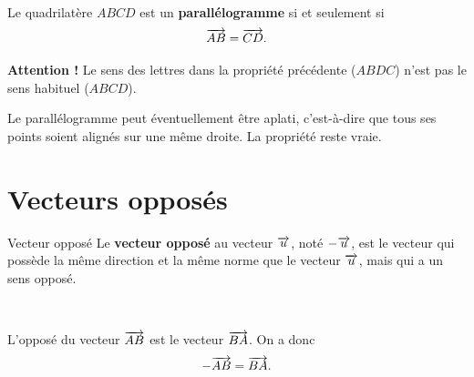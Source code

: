 \documentclass[11pt]{article}
\begin{document}
\begin{prop}~\\[-5mm]
  \begin{minipage}[]{.68\textwidth}
  Le quadrilatère $ABCD$ est un \textbf{parallélogramme} si et seulement si
  \[
    \overrightarrow{AB} = \overrightarrow{CD}.
  \]
\end{minipage}\hspace{-6mm}
  \begin{minipage}[]{.32\textwidth}
    \begin{center}
    \end{center}
  \end{minipage}
\end{prop}

\begin{rmq}
  \textbf{Attention !} Le sens des lettres dans la propriété précédente ($ABDC$)
  n'est pas le sens habituel ($ABCD$).
\end{rmq}
\begin{rmq}
  Le parallélogramme peut éventuellement être aplati, c'est-à-dire que tous ses
  points soient alignés sur une même droite. La propriété reste vraie.
\end{rmq}
\section{Vecteurs opposés}
\begin{defi}{Vecteur opposé}
  Le \textbf{vecteur opposé} au vecteur $\overrightarrow{u}$, noté $-\overrightarrow{u}$, est le
  vecteur qui possède la même direction et la même norme que le vecteur $\overrightarrow{u}$, mais qui a un sens opposé.
\end{defi}
\begin{prop}~\\[-2mm]
  \begin{minipage}[]{.6\textwidth}
  L'opposé du vecteur $\overrightarrow{AB}$ est le vecteur $\overrightarrow{BA}$. On a donc
  \[
    -\overrightarrow{AB} = \overrightarrow{BA}.
  \]
  \end{minipage}
  \begin{minipage}[]{.4\textwidth}
    \begin{center}
    \end{center}
  \end{minipage}
\end{prop}
    
\end{document}
